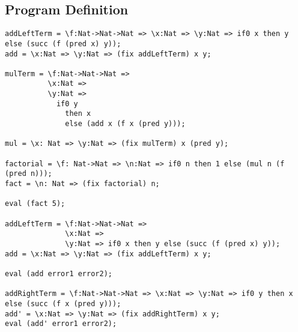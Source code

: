 \documentclass[12pt,a4paper]{report}
\theoremstyle{definition}
\theoremstyle{remark}
\begin{document}
\subsection{Program Definition}

\begin{verbatim}
addLeftTerm = \f:Nat->Nat->Nat => \x:Nat => \y:Nat => if0 x then y else (succ (f (pred x) y));
add = \x:Nat => \y:Nat => (fix addLeftTerm) x y;

mulTerm = \f:Nat->Nat->Nat => 
          \x:Nat => 
          \y:Nat => 
            if0 y 
              then x 
              else (add x (f x (pred y)));

mul = \x: Nat => \y:Nat => (fix mulTerm) x (pred y);

factorial = \f: Nat->Nat => \n:Nat => if0 n then 1 else (mul n (f (pred n)));
fact = \n: Nat => (fix factorial) n;

eval (fact 5);

addLeftTerm = \f:Nat->Nat->Nat => 
              \x:Nat => 
              \y:Nat => if0 x then y else (succ (f (pred x) y));
add = \x:Nat => \y:Nat => (fix addLeftTerm) x y;

eval (add error1 error2);

addRightTerm = \f:Nat->Nat->Nat => \x:Nat => \y:Nat => if0 y then x else (succ (f x (pred y)));
add' = \x:Nat => \y:Nat => (fix addRightTerm) x y;
eval (add' error1 error2);
\end{verbatim}
\end{document}
